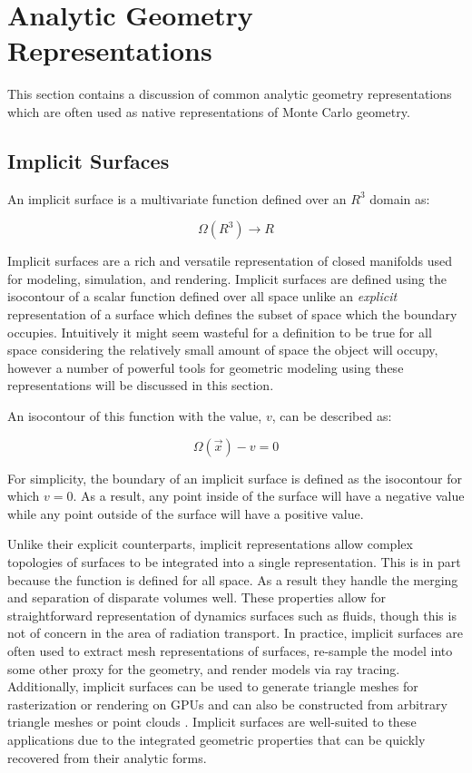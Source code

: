 \section{Analytic Geometry Representations}\label{sec:analytic_geometry}

This section contains a discussion of common analytic geometry  representations
which are often used as native representations of Monte Carlo geometry.

\subsection{Implicit Surfaces}\label{subsec:implicit_surfaces}

An implicit surface is a multivariate function defined over an $ R^3 $ domain as:

\begin{equation}
    \Omega(R^3)\rightarrow R
\end{equation}

Implicit surfaces are a rich and versatile representation of closed manifolds
used for modeling, simulation, and rendering. Implicit surfaces are defined
using the isocontour of a scalar function defined over all space unlike an
\textit{explicit} representation of a surface which defines the subset of space
which the boundary occupies. Intuitively it might seem wasteful for a definition
to be true for all space considering the relatively small amount of space the
object will occupy, however a number of powerful tools for geometric modeling
using these representations will be discussed in this section.

An isocontour of this function with the value, $v$, can be described as:

\begin{equation}
  \Omega(\vec{x}) - v  = 0 
\end{equation}

For simplicity, the boundary of an implicit surface is defined as the isocontour
for which $v=0$. As a result, any point inside of the surface will have a negative value
while any point outside of the surface will have a positive value.

Unlike their explicit counterparts, implicit representations allow complex
topologies of surfaces to be integrated into a single representation. This is in
part because the function is defined for all space. As a result they handle the
merging and separation of disparate volumes well. These properties allow for
straightforward representation of dynamics surfaces such as fluids, though this
is not of concern in the area of radiation transport. In practice, implicit
surfaces are often used to extract mesh representations of surfaces, re-sample
the model into some other proxy for the geometry, and render models via ray
tracing. Additionally, implicit surfaces can be used to generate triangle meshes
for rasterization or rendering on GPUs \cite{Sethian_1996} and can also be
constructed from arbitrary triangle meshes or point clouds
\cite{Sigg_2006}. Implicit surfaces are well-suited to these applications due to
the integrated geometric properties that can be quickly recovered from their
analytic forms.

